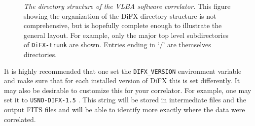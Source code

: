 \begin{figure}[h]
\begin{center}
\caption[dirtree]{
{\em The directory structure of the VLBA software correlator.}  
This figure showing the organization of the DiFX directory structure is not comprehensive, but is hopefully complete enough to illustrate the general layout.
For example, only the major top level subdirectories of {\tt DiFX-trunk} are shown.
Entries ending in `/' are themselves directories.
\label{fig:dirtree}
}
\end{center}
\end{figure}

It is highly recommended that one set the {\tt DIFX\_VERSION} environment variable and make sure that for each installed version of DiFX this is set differently.
It may also be desirable to customize this for your correlator.
For example, one may set it to {\tt USNO-DIFX-1.5} .
This string will be stored in intermediate files and the output FITS files and will be able to identify more exactly where the data were correlated.
